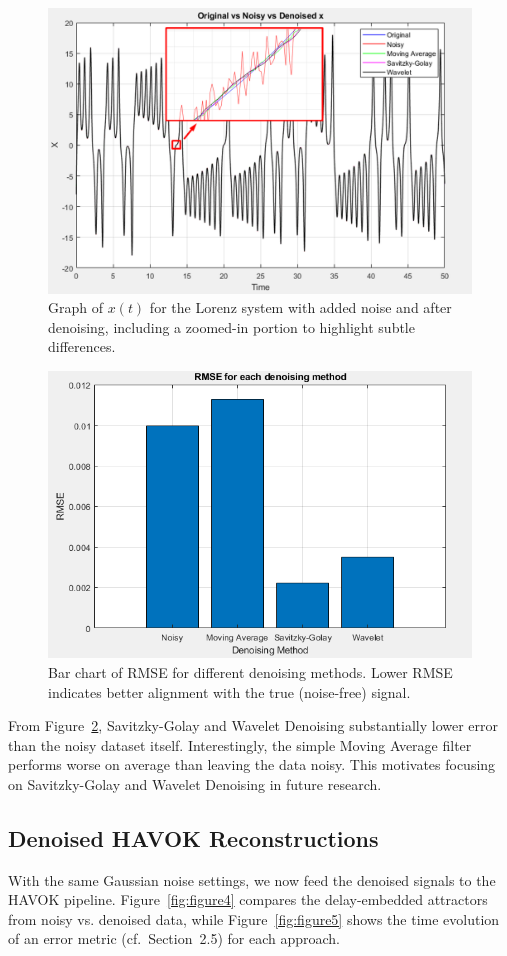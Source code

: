 \documentclass[11pt]{article}
\begin{document}
	\begin{figure}[htbp]
		\centering
		\includegraphics[width=0.7\linewidth]{Figure1}
		\caption{Graph of \(x(t)\) for the Lorenz system with added noise and after denoising, including a zoomed-in portion to highlight subtle differences.}
		\label{fig:figure2}
	\end{figure}
	
	\begin{figure}[htbp]
		\centering
		\includegraphics[width=0.7\linewidth]{Figure2}
		\caption{Bar chart of RMSE for different denoising methods. Lower RMSE indicates better alignment with the true (noise-free) signal.}
		\label{fig:figure3}
	\end{figure}
	
	From Figure~\ref{fig:figure3}, Savitzky-Golay and Wavelet Denoising substantially lower error than the noisy dataset itself. Interestingly, the simple Moving Average filter performs worse on average than leaving the data noisy. This motivates focusing on Savitzky-Golay and Wavelet Denoising in future research.
	
	\subsection{Denoised HAVOK Reconstructions}
	With the same Gaussian noise settings, we now feed the denoised signals to the HAVOK pipeline. Figure~\ref{fig:figure4} compares the delay-embedded attractors from noisy vs. denoised data, while Figure~\ref{fig:figure5} shows the time evolution of an error metric (cf.\ Section~2.5) for each approach.
	
\end{document}
